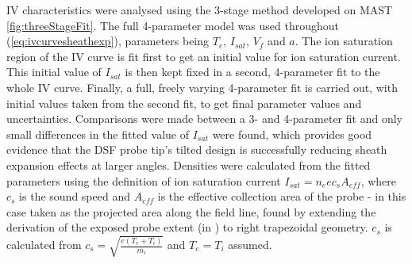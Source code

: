 \documentclass[a4paper, 12pt]{article} %
\begin{document}
	IV characteristics were analysed using the 3-stage method developed on MAST \cref{fig:threeStageFit}.
	The full 4-parameter model was used throughout (\cref{eq:ivcurvesheathexp}), parameters being $T_e$, $I_{sat}$, $V_f$ and $a$.
	The ion saturation region of the IV curve is fit first to get an initial value for ion saturation current.
	This initial value of $I_{sat}$ is then kept fixed in a second, 4-parameter fit to the whole IV curve. 
	Finally, a full, freely varying 4-parameter fit is carried out, with initial values taken from the second fit, to get final parameter values and uncertainties.
	Comparisons were made between a 3- and 4-parameter fit and only small differences in the fitted value of $I_{sat}$ were found, which provides good evidence that the DSF probe tip's tilted design is successfully reducing sheath expansion effects at larger angles.
	Densities were calculated from the fitted parameters using the definition of ion saturation current $I_{sat} = n_e e c_s A_{eff}$, 
	where $c_s$ is the sound speed and $A_{eff}$ is the effective collection area of the probe - in this case taken as the projected area along the field line, found by extending the derivation of the exposed probe extent (in \cite{Harrison}) to right trapezoidal geometry.
	$c_s$ is calculated from $c_s = \sqrt{\frac{e(T_e + T_i)}{m_i}}$ and $T_e = T_i$ assumed. 
\end{document}
